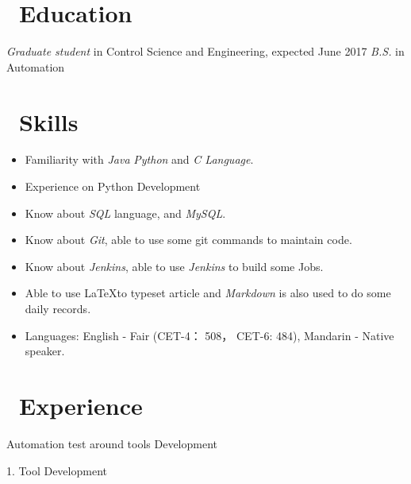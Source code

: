 \documentclass{resume}
\begin{document}


 
\section{\faGraduationCap\ Education}
\textit{Graduate student} in Control Science and Engineering, expected June 2017
\textit{B.S.} in Automation


\section{\faCogs\ Skills}
\begin{itemize}[parsep=1ex]
  \item Familiarity with \emph{Java} \emph{Python} and \emph{C Language}.
  \item Experience on Python Development
  \item Know about \emph{SQL} language, and \emph{MySQL}.
  \item Know about \emph{Git}, able to use some git commands to maintain code.
  \item Know about \emph{Jenkins}, able to use \emph{Jenkins} to build some Jobs.
  \item Able to use \LaTeX   to typeset article and \emph{Markdown} is also used to do some daily records.
  \item Languages: English - Fair (CET-4： 508， CET-6: 484), Mandarin - Native speaker.
\end{itemize}

\section{\faUsers\ Experience}
Automation test around tools Development

1. Tool Development
\end{document}
